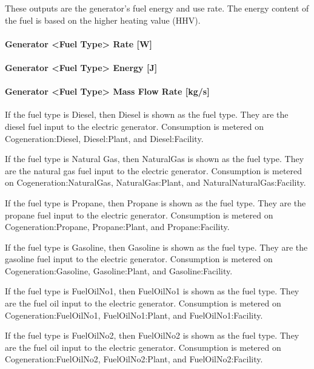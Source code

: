 These outputs are the generator's fuel energy and use rate. The energy content of the fuel is based on the higher heating value (HHV).

\paragraph{Generator \textless{}Fuel Type\textgreater{} Rate {[}W{]}}\label{generator-fuel-type-rate-w}

\paragraph{Generator \textless{}Fuel Type\textgreater{} Energy {[}J{]}}\label{generator-fuel-type-energy-j}

\paragraph{Generator \textless{}Fuel Type\textgreater{} Mass Flow Rate {[}kg/s{]}}\label{generator-fuel-type-mass-flow-rate-kgs}

If the fuel type is Diesel, then Diesel is shown as the fuel type. They are the diesel fuel input to the electric generator. Consumption is metered on Cogeneration:Diesel, Diesel:Plant, and Diesel:Facility.

If the fuel type is Natural Gas, then NaturalGas is shown as the fuel type. They are the natural gas fuel input to the electric generator. Consumption is metered on Cogeneration:NaturalGas, NaturalGas:Plant, and NaturalNaturalGas:Facility.

If the fuel type is Propane, then Propane is shown as the fuel type. They are the propane fuel input to the electric generator. Consumption is metered on Cogeneration:Propane, Propane:Plant, and Propane:Facility.

If the fuel type is Gasoline, then Gasoline is shown as the fuel type. They are the gasoline fuel input to the electric generator. Consumption is metered on Cogeneration:Gasoline, Gasoline:Plant, and Gasoline:Facility.

If the fuel type is FuelOilNo1, then FuelOilNo1 is shown as the fuel type. They are the fuel oil input to the electric generator. Consumption is metered on Cogeneration:FuelOilNo1, FuelOilNo1:Plant, and FuelOilNo1:Facility.

If the fuel type is FuelOilNo2, then FuelOilNo2 is shown as the fuel type. They are the fuel oil input to the electric generator. Consumption is metered on Cogeneration:FuelOilNo2, FuelOilNo2:Plant, and FuelOilNo2:Facility.

